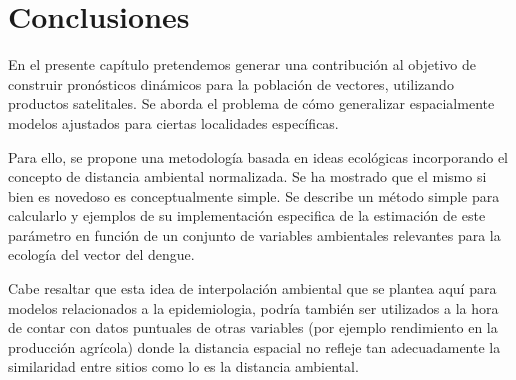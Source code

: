 \section{Conclusiones}
  \par En el presente capítulo pretendemos generar una contribución al objetivo de
    construir pronósticos dinámicos para la población de vectores,
    utilizando productos satelitales. Se aborda el problema de cómo generalizar
    espacialmente modelos ajustados para ciertas localidades específicas.

  \par Para ello, se propone una metodología basada en ideas ecológicas
    incorporando el concepto de distancia ambiental normalizada.
    Se ha mostrado que el mismo si bien es novedoso es conceptualmente simple.
    Se describe un método simple para calcularlo y ejemplos de su
    implementación especifica de la estimación de este parámetro en
    función de un conjunto de variables ambientales relevantes para la
    ecología del vector del dengue.

  \par Cabe resaltar que esta idea de interpolación ambiental que se
    plantea aquí para modelos relacionados a la epidemiologia,
    podría también ser utilizados a la hora de contar con datos
    puntuales de otras variables (por ejemplo rendimiento en la producción
    agrícola) donde la distancia espacial no refleje tan adecuadamente la
    similaridad entre sitios como lo es la distancia ambiental.

